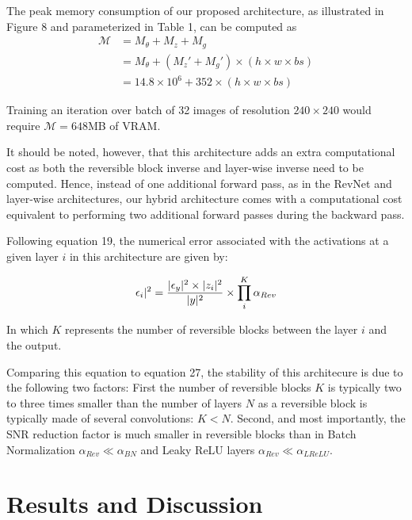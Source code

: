 \documentclass[twocolumn]{bmcart}
\begin{document}
The peak memory consumption of our proposed architecture, as illustrated in Figure 8 and parameterized in Table 1, can be computed as
\begin{subequations}
\begin{align}
\mathcal{M} &= M_{\theta} + M_{z} + M_{g} \\
            &= M_{\theta} + (M_z' + M_{g}') \times (h \times w \times bs) \\
            &= 14.8 \times 10^6 + 352 \times (h \times w \times bs)
\end{align}
\end{subequations}

Training an iteration over batch of 32 images of resolution $240 \times 240$ would require $\mathcal{M}=648$MB of VRAM.

It should be noted, however, that this architecture adds an extra computational cost as both the reversible block inverse and layer-wise inverse need to be computed.
Hence, instead of one additional forward pass, as in the RevNet and layer-wise architectures,
our hybrid architecture comes with a computational cost equivalent to performing two additional forward passes
during the backward pass.

Following equation 19, the numerical error associated with the activations at a given layer $i$ in this architecture are given by:

\begin{equation}
\epsilon_i |^2 =  \frac{| \epsilon_y |^2 \times | z_i |^2}{| y |^2} \times \prod_i^{K} \alpha_{Rev} \\
\end{equation}

In which $K$ represents the number of reversible blocks between the layer $i$ and the output.

Comparing this equation to equation 27, the stability of this architecure is due to the following two factors:
First the number of reversible blocks $K$ is typically two to three times smaller
than the number of layers $N$ as a reversible block is typically made of several convolutions: $K<N$.
Second, and most importantly, the SNR reduction factor is much smaller in reversible blocks
than in Batch Normalization $\alpha_{Rev} \ll \alpha_{BN}$ and Leaky ReLU layers $\alpha_{Rev} \ll \alpha_{LReLU}$.

\section{Results and Discussion}
\end{document}
